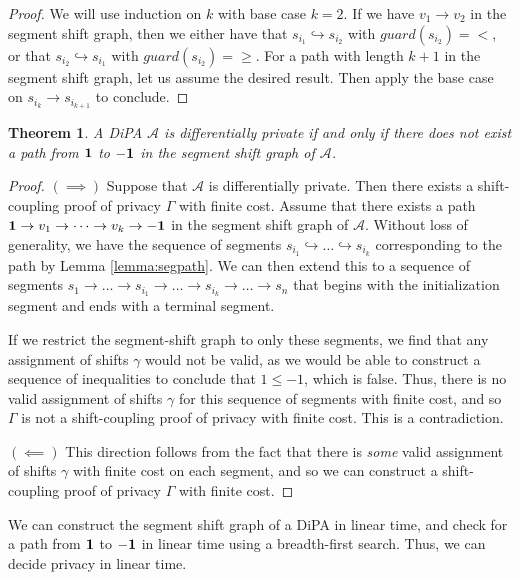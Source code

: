 \documentclass{article}
\newtheorem{theorem}{Theorem}
\newcommand{\1}{\langle 1 \rangle}
\newcommand{\2}{\langle 2 \rangle}
\begin{document}
\begin{proof}
    We will use induction on $k$ with base case $k = 2$. If we have $v_1 \to v_2$ in the segment shift graph, then we either have that $s_{i_1} \hookrightarrow s_{i_2}$ with $guard(s_{i_2}) = <$, or that $s_{i_2} \hookrightarrow s_{i_1}$ with $guard(s_{i_2}) = \geq$. For a path with length $k + 1$ in the segment shift graph, let us assume the desired result. Then apply the base case on $s_{i_{k}} \to s_{i_{k + 1}}$ to conclude. 
\end{proof}

\begin{theorem}
    \label{theorem:decide_privacy}
    A DiPA $\mathcal{A}$ is differentially private if and only if there does not exist a path from $\bf 1$ to $\bf -1$ in the segment shift graph of $\mathcal{A}$.
\end{theorem}

\begin{proof}
    $(\implies)$ Suppose that $\mathcal{A}$ is differentially private. Then there exists a shift-coupling proof of privacy $\Gamma$ with finite cost. Assume that there exists a path ${\bf 1} \to v_1 \to \dots \to v_k \to {\bf -1}$ in the segment shift graph of $\mathcal{A}$. Without loss of generality, we have the sequence of segments $s_{i_1} \hookrightarrow \dots \hookrightarrow s_{i_k}$ corresponding to the path by Lemma \ref{lemma:segpath}. We can then extend this to a sequence of segments $s_1 \to \dots \to s_{i_1} \to \dots \to s_{i_k} \to \dots \to s_n$ that begins with the initialization segment and ends with a terminal segment. 

    If we restrict the segment-shift graph to only these segments, we find that any assignment of shifts $\gamma$ would not be valid, as we would be able to construct a sequence of inequalities to conclude that $1 \leq -1$, which is false. Thus, there is no valid assignment of shifts $\gamma$ for this sequence of segments with finite cost, and so $\Gamma$ is not a shift-coupling proof of privacy with finite cost. This is a contradiction.

    $(\impliedby)$ This direction follows from the fact that there is \textit{some} valid assignment of shifts $\gamma$ with finite cost on each segment, and so we can construct a shift-coupling proof of privacy $\Gamma$ with finite cost.
\end{proof}


We can construct the segment shift graph of a DiPA in linear time, and check for a path from $\bf 1$ to $\bf -1$ in linear time using a breadth-first search. Thus, we can decide privacy in linear time.
\end{document}
